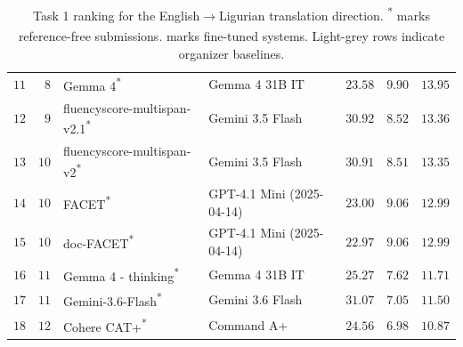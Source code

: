 \begin{table}[t]
\begin{tabular}{rrllrrr}
\rowcolor{black!15} $11$ & $8$ & Gemma 4\textsuperscript{*} & Gemma 4 31B IT & $23.58$ & $9.90$ & $13.95$ \\
$12$ & $9$ & fluencyscore-multispan-v2.1\textsuperscript{*} & Gemini 3.5 Flash & $30.92$ & $8.52$ & $13.36$ \\
$13$ & $10$ & fluencyscore-multispan-v2\textsuperscript{*} & Gemini 3.5 Flash & $30.91$ & $8.51$ & $13.35$ \\
$14$ & $10$ & FACET\textsuperscript{*} & GPT-4.1 Mini (2025-04-14) & $23.00$ & $9.06$ & $12.99$ \\
$15$ & $10$ & doc-FACET\textsuperscript{*} & GPT-4.1 Mini (2025-04-14) & $22.97$ & $9.06$ & $12.99$ \\
\rowcolor{black!15} $16$ & $11$ & Gemma 4 - thinking\textsuperscript{*} & Gemma 4 31B IT & $25.27$ & $7.62$ & $11.71$ \\
\rowcolor{black!15} $17$ & $11$ & Gemini-3.6-Flash\textsuperscript{*} & Gemini 3.6 Flash & $31.07$ & $7.05$ & $11.50$ \\
$18$ & $12$ & Cohere CAT+\textsuperscript{*} & Command A+ & $24.56$ & $6.98$ & $10.87$ \\
\bottomrule
\end{tabular}
\caption{Task 1 ranking for the English$\rightarrow$Ligurian translation direction. \textsuperscript{*} marks reference-free submissions. \textsuperscript{\textdagger} marks fine-tuned systems. Light-grey rows indicate organizer baselines.}
\label{tab:task1-eng-lij-results}
\end{table}

